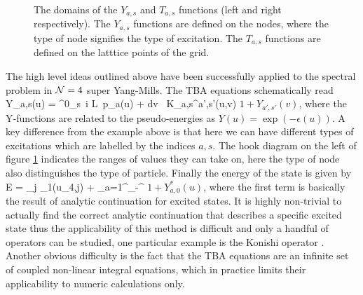 \begin{figure}[t]
\caption[The domains of the $Y_{a,s}$ and $T_{a,s}$ functions]{The domains of the $Y_{a,s}$ and $T_{a,s}$ functions (left and right respectively). The $Y_{a,s}$ functions are defined on the nodes, where the type of node signifies the type of excitation. The $T_{a,s}$ functions are defined on the latttice points of the grid.}
\label{fig:yt_hooks}
\end{figure}

The high level ideas outlined above have been successfully applied to the spectral problem in $\mathcal{N}=4$ super Yang-Mills.
The TBA equations schematically read \cite{Gromov:2009bc, Arutyunov:2009ur}
\beq
	\label{eq:tba_final}
	\log Y_{a,s}(u) = \delta^0_s\, i L\, p_a(u) + \int dv \, K_{a,s}^{a',s'}(u,v) \log \( 1+Y_{a',s'}(v) \),
\eeq
where the Y-functions are related to the pseudo-energies as $Y(u) = \exp(-\epsilon(u))$.
A key difference from the example above is that here we can have different types of excitations which are labelled by the indices $a,s$. 
The hook diagram on the left of figure \ref{fig:yt_hooks} indicates the ranges of values they can take on,
here the type of node also distinguishes the type of particle.
Finally the energy of the state is given by
\beq
	E = \sum_j \epsilon_1(u_{4,j}) + \sum_{a=1}^\infty \int_{-\infty}^\infty {}  \log \(1 + Y_{a,0}^* (u) \),
\eeq
where the first term is basically the result of analytic continuation for excited states.
It is highly non-trivial to actually find the correct analytic continuation that describes a specific excited state thus the applicability of this method is difficult and only a handful of operators can be studied, one particular example is the Konishi operator \cite{Gromov:2009zb}.
Another obvious difficulty is the fact that the TBA equations  are an infinite set of coupled non-linear integral equations, which in practice limits their applicability to numeric calculations only. 


